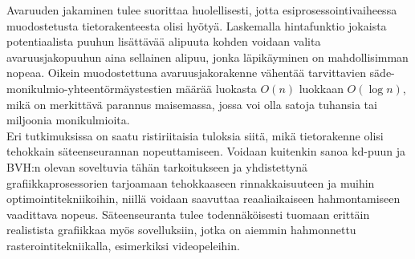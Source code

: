 \documentclass[a4paper, 12pt, titlepage]{article}
\begin{document}
Avaruuden jakaminen tulee suorittaa huolellisesti, jotta esiprosessointivaiheessa muodostetusta tietorakenteesta olisi hyötyä. Laskemalla hintafunktio jokaista potentiaalista puuhun lisättävää alipuuta kohden voidaan valita avaruusjakopuuhun aina sellainen alipuu, jonka läpikäyminen on mahdollisimman nopeaa. Oikein muodostettuna avaruusjakorakenne vähentää tarvittavien säde-monikulmio-yhteentörmäystestien määrää luokasta $O(n)$ luokkaan $O(\log n)$, mikä on merkittävä parannus maisemassa, jossa voi olla satoja tuhansia tai miljoonia monikulmioita. \\

Eri tutkimuksissa on saatu ristiriitaisia tuloksia siitä, mikä tietorakenne olisi tehokkain säteenseurannan nopeuttamiseen. Voidaan kuitenkin sanoa kd-puun ja BVH:n olevan soveltuvia tähän tarkoitukseen ja yhdistettynä grafiikkaprosessorien tarjoamaan tehokkaaseen rinnakkaisuuteen ja muihin optimointitekniikoihin, niillä voidaan saavuttaa reaaliaikaiseen hahmontamiseen vaadittava nopeus. Säteenseuranta tulee todennäköisesti tuomaan erittäin realistista grafiikkaa myös sovelluksiin, jotka on aiemmin hahmonnettu rasterointitekniikalla, esimerkiksi videopeleihin. \\



\clearpage

\clearpage
\end{document}
